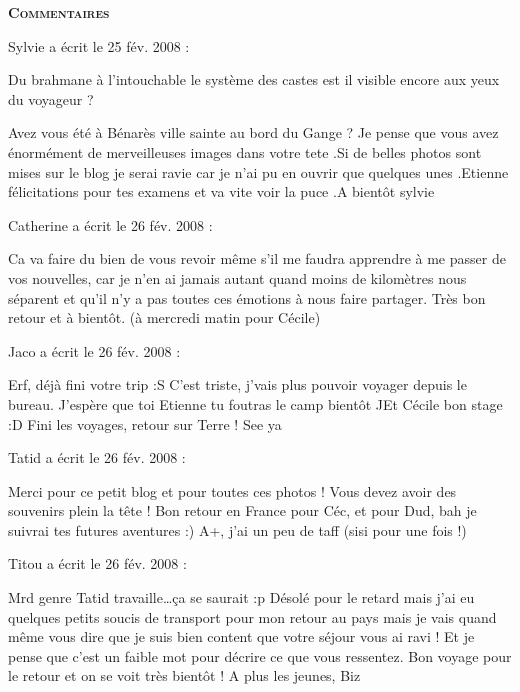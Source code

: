 \bigskip
\textbf{\textsc{Commentaires}}

\medskip
Sylvie a écrit le 25 fév. 2008 :
\begin{displayquote}
Du brahmane à l'intouchable le système des castes est il visible encore aux yeux du voyageur ?

Avez vous été à Bénarès ville sainte au bord du Gange ?	Je pense que vous avez énormément de merveilleuses images dans votre tete .Si de belles photos sont mises sur le blog je serai ravie car je n'ai pu en ouvrir que quelques unes .Etienne félicitations pour tes examens et va vite voir la puce .A bientôt sylvie
\end{displayquote}

\medskip
Catherine a écrit le 26 fév. 2008 :
\begin{displayquote}
Ca va faire du bien de vous revoir même s'il me faudra apprendre à me passer de vos nouvelles, car je n'en ai jamais autant quand moins de kilomètres nous séparent et qu'il n'y a pas toutes ces émotions à nous faire partager.
         Très bon retour et à bientôt. (à mercredi matin pour Cécile)
\end{displayquote}

\medskip
Jaco a écrit le 26 fév. 2008 :
\begin{displayquote}
Erf, déjà fini votre trip :S C'est triste, j'vais plus pouvoir voyager depuis le bureau.
J'espère que toi Etienne tu foutras le camp bientôt ^^
Et Cécile bon stage :D Fini les voyages, retour sur Terre !
See ya
\end{displayquote}

\medskip
Tatid a écrit le 26 fév. 2008 :
\begin{displayquote}
Merci pour ce petit blog et pour toutes ces photos ! Vous devez avoir des souvenirs plein la tête !
Bon retour en France pour Céc, et pour Dud, bah je suivrai tes futures aventures :)
A+, j'ai un peu de taff (sisi pour une fois !)
\end{displayquote}

\medskip
Titou a écrit le 26 fév. 2008 :
\begin{displayquote}
Mrd genre Tatid travaille\dots ça se saurait :p
Désolé pour le retard mais j'ai eu quelques petits soucis de transport pour mon retour au pays mais je vais quand même vous dire que je suis bien content que votre séjour vous ai ravi ! Et je pense que c'est un faible mot pour décrire ce que vous ressentez. Bon voyage pour le retour et on se voit très bientôt !
A plus les jeunes, Biz
\end{displayquote}

